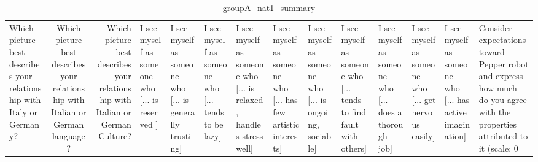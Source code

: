 \begin{table}
\caption{groupA_nat1_summary}
\label{tab:groupA_nat1_summary}
\begin{tabular}{lcr}
\toprule
Which picture best describes your relationship with Italy or Germany? & Which picture best describes your relationship with Italian or German language? & Which picture best describes your relationship with Italian or German Culture? & I see myself as someone who  [... is reserved ] & I see myself as someone who  [... is generally trusting] & I see myself as someone who  [... tends to be lazy] & I see myself as someone who  [... is relaxed, handles stress well] & I see myself as someone who  [... has few artistic interests] & I see myself as someone who  [... is ongoing, sociable] & I see myself as someone who  [... tends to find fault with others] & I see myself as someone who  [... does a thorough job] & I see myself as someone who  [... get nervous easily] & I see myself as someone who  [... has active imagination] & Consider expectations toward Pepper robot and express how much do you agree with the properties attributed to it (scale: 0%
\end{tabular}
\end{table}
